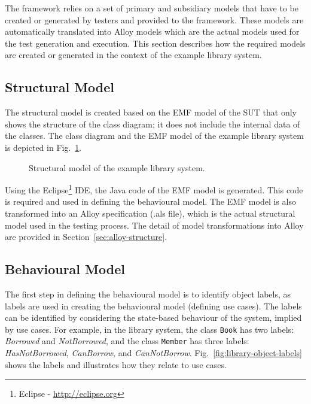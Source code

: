 %
%
\label{sec:create-test-model}
The framework relies on a set of primary and subsidiary models that have to be  created or generated by testers and provided to the framework. These models are automatically translated into Alloy models which are the actual models used for the test generation and execution. This section describes how the required models are created or generated in the context of the example library system. %

\subsection{Structural Model}
\label{sec:create-test model-structure}
The structural model is created based on the EMF model of the SUT that only shows the structure of the class diagram; it does not include the internal data of the classes. The class diagram and the EMF model of the example library system is depicted in Fig.~\ref{fig:library-structure-model}.

\begin{figure}[h]
\centering
{}
\hfil
{}
\caption{Structural model of the example library system.}
\label{fig:library-structure-model}
\end{figure} 

Using the Eclipse\footnote{Eclipse - \url{http://eclipse.org}} IDE, the Java code of the EMF model is generated. This code is required and used in defining the behavioural model. The EMF model is also transformed into an Alloy specification (.als file), which is the actual structural model used in the testing process. The detail of model transformations into Alloy are provided in Section~\ref{sec:alloy-structure}.

\subsection{Behavioural Model}
\label{sec:create-test model-behaviour}
The first step in defining the behavioural model is to identify object labels, as labels are used in creating the behavioural model (defining use cases). The labels can be identified by considering the state-based behaviour of the system, implied by use cases. For example, in the library system, the class \texttt{Book} has two labels: \textit{Borrowed} and \textit{NotBorrowed}, and the class \texttt{Member} has three labels: \textit{HasNotBorrowed}, \textit{CanBorrow}, and \textit{CanNotBorrow}. Fig.~\ref{fig:library-object-labels} shows the labels and illustrates how they relate to use cases.

